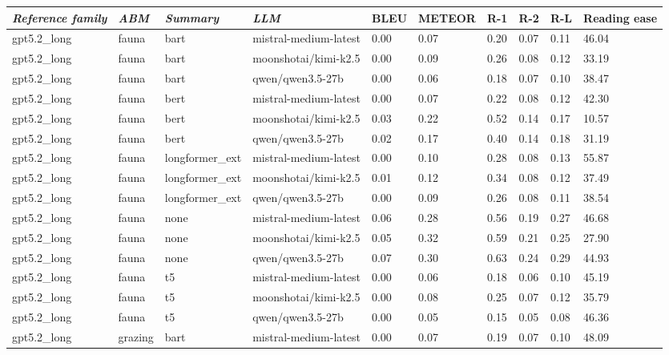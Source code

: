\begin{tabular}{|l|l|l|l|l|l|l|l|l|l|}
\hline
\textit{\textbf{Reference family}} & \textit{\textbf{ABM}} & \textit{\textbf{Summary}} & \textit{\textbf{LLM}} & BLEU & METEOR & R-1 & R-2 & R-L & Reading ease \\
 \hline
 gpt5.2\_long & fauna & bart & mistral-medium-latest & 0.00 & 0.07 & 0.20 & 0.07 & 0.11 & 46.04 \\
 \hline
 gpt5.2\_long & fauna & bart & moonshotai/kimi-k2.5 & 0.00 & 0.09 & 0.26 & 0.08 & 0.12 & 33.19 \\
 \hline
 gpt5.2\_long & fauna & bart & qwen/qwen3.5-27b & 0.00 & 0.06 & 0.18 & 0.07 & 0.10 & 38.47 \\
 \hline
 gpt5.2\_long & fauna & bert & mistral-medium-latest & 0.00 & 0.07 & 0.22 & 0.08 & 0.12 & 42.30 \\
 \hline
 gpt5.2\_long & fauna & bert & moonshotai/kimi-k2.5 & 0.03 & 0.22 & 0.52 & 0.14 & 0.17 & 10.57 \\
 \hline
 gpt5.2\_long & fauna & bert & qwen/qwen3.5-27b & 0.02 & 0.17 & 0.40 & 0.14 & 0.18 & 31.19 \\
 \hline
 gpt5.2\_long & fauna & longformer\_ext & mistral-medium-latest & 0.00 & 0.10 & 0.28 & 0.08 & 0.13 & 55.87 \\
 \hline
 gpt5.2\_long & fauna & longformer\_ext & moonshotai/kimi-k2.5 & 0.01 & 0.12 & 0.34 & 0.08 & 0.12 & 37.49 \\
 \hline
 gpt5.2\_long & fauna & longformer\_ext & qwen/qwen3.5-27b & 0.00 & 0.09 & 0.26 & 0.08 & 0.11 & 38.54 \\
 \hline
 gpt5.2\_long & fauna & none & mistral-medium-latest & 0.06 & 0.28 & 0.56 & 0.19 & 0.27 & 46.68 \\
 \hline
 gpt5.2\_long & fauna & none & moonshotai/kimi-k2.5 & 0.05 & 0.32 & 0.59 & 0.21 & 0.25 & 27.90 \\
 \hline
 gpt5.2\_long & fauna & none & qwen/qwen3.5-27b & 0.07 & 0.30 & 0.63 & 0.24 & 0.29 & 44.93 \\
 \hline
 gpt5.2\_long & fauna & t5 & mistral-medium-latest & 0.00 & 0.06 & 0.18 & 0.06 & 0.10 & 45.19 \\
 \hline
 gpt5.2\_long & fauna & t5 & moonshotai/kimi-k2.5 & 0.00 & 0.08 & 0.25 & 0.07 & 0.12 & 35.79 \\
 \hline
 gpt5.2\_long & fauna & t5 & qwen/qwen3.5-27b & 0.00 & 0.05 & 0.15 & 0.05 & 0.08 & 46.36 \\
 \hline
 gpt5.2\_long & grazing & bart & mistral-medium-latest & 0.00 & 0.07 & 0.19 & 0.07 & 0.10 & 48.09 \\

\end{tabular}
